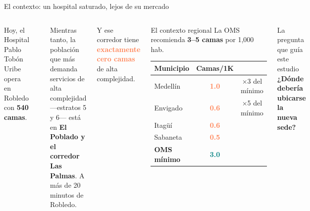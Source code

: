 \documentclass[aspectratio=169, 11pt]{beamer}
\newcommand{\highlight}[1]{\textcolor{teal}{\textbf{#1}}}
\newcommand{\danger}[1]{\textcolor{coral}{\textbf{#1}}}
\begin{document}
{
\begin{frame}{El contexto: un hospital saturado, lejos de su mercado}

\begin{columns}[T]
Hoy, el Hospital Pablo Tobón Uribe opera en Robledo con \textbf{540 camas}.

\vspace{2pt}
\begin{center}
\end{center}

\vspace{2pt}
{\small Mientras tanto, la población que más demanda servicios de alta complejidad ---estratos 5 y 6--- está en \textbf{El Poblado y el corredor Las Palmas}. A más de 20 minutos de Robledo.

\vspace{4pt}
Y ese corredor tiene \danger{exactamente cero camas} de alta complejidad.}

\vspace{2pt}
\begin{alertblock}{\small El contexto regional}
\footnotesize
La OMS recomienda \textbf{3--5 camas} por 1,000 hab.

\vspace{3pt}
\begin{tabular}{@{}lcc@{}}
\toprule
\textbf{Municipio} & \textbf{Camas/1K} & \\
\midrule
\rowcolor{coral!10}
Medellín & \danger{1.0} & {\tiny $\times$3 del mínimo} \\
\rowcolor{coral!8}
Envigado & \danger{0.6} & {\tiny $\times$5 del mínimo} \\
Itagüí & \danger{0.6} & \\
Sabaneta & \danger{0.5} & \\
\midrule
\textbf{OMS mínimo} & \highlight{3.0} & \\
\bottomrule
\end{tabular}
\end{alertblock}

\vspace{4pt}
\begin{exampleblock}{\small La pregunta que guía este estudio}
\centering
\textbf{¿Dónde debería ubicarse la nueva sede?}
\end{exampleblock}
\end{columns}
\end{frame}
}
\end{document}
